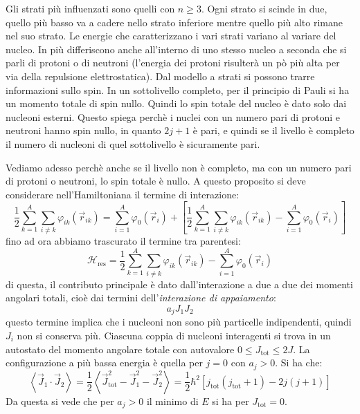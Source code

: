 Gli strati più influenzati sono quelli con $n \ge 3$. Ogni strato si scinde in
due, quello più basso va a cadere nello strato inferiore mentre quello più alto
rimane nel suo strato. Le energie che caratterizzano i vari strati variano al
variare del nucleo. In più differiscono anche all'interno di uno stesso nucleo a
seconda che si parli di protoni o di neutroni (l'energia dei protoni risulterà
un pò più alta per via della repulsione elettrostatica).
Dal modello a strati si possono trarre informazioni sullo spin.
In un sottolivello completo, per il principio di Pauli si ha un momento totale
di spin nullo. Quindi lo spin totale del nucleo è dato solo dai nucleoni
esterni. Questo spiega perchè i nuclei con un numero pari di protoni e neutroni
hanno spin nullo, in quanto $2j+1$ è pari, e quindi se il livello è completo il
numero di nucleoni di quel sottolivello è sicuramente pari.

Vediamo adesso perchè anche se il livello non è completo, ma con un numero pari
di protoni o neutroni, lo spin totale è nullo.
A questo proposito si deve considerare nell'Hamiltoniana il termine di interazione:
\begin{equation}
\frac{1}{2} \sum_{k=1}^A \sum_{i \ne k} \varphi_{ik}{\left( \vec{r}_{ik}\right)} = \sum_{i=1}^A \varphi_0{(\vec{r}_i)} + \left[ \frac{1}{2} \sum_{k=1}^A \sum_{i \ne k} \varphi_{ik}{\left( \vec{r}_{ik}\right)} - \sum_{i=1}^A \varphi_0{(\vec{r}_i)} \right] 
\end{equation}
fino ad ora abbiamo trascurato il termine tra parentesi:
\begin{equation}
\mathcal{H}_\text{res} = \frac{1}{2} \sum_{k=1}^A \sum_{i \ne k} \varphi_{ik}{\left( \vec{r}_{ik}\right)} - \sum_{i=1}^A \varphi_0{(\vec{r}_i)}
\end{equation}
di questa, il contributo principale è dato dall'interazione a due a due dei
momenti angolari totali, cioè dai termini dell'\textit{interazione di
appaiamento}:
\begin{equation}
a_j J_1 J_2
\end{equation}
questo termine implica che i nucleoni non sono più particelle indipendenti,
quindi $J_i$ non si conserva più. Ciascuna coppia di nucleoni interagenti si
trova in un autostato del momento angolare totale con autovalore $0 \le
J_\text{tot} \le 2J$. La configurazione a più bassa energia è quella per $j = 0$
con $a_j > 0$. Si ha che:
\begin{equation}
\left\langle \vec{J}_1 \cdot \vec{J}_2 \right\rangle = \frac{1}{2} \left\langle \vec{J}_\text{tot}^2 - \vec{J}_{1}^2 - \vec{J}_{2}^2 \right\rangle = \frac{1}{2} \hbar^2 \left[ j_\text{tot}(j_\text{tot} + 1) - 2j(j + 1) \right] 
\end{equation}
Da questa si vede che per $a_j > 0$ il minimo di $E$ si ha per $J_\text{tot} = 0$.

